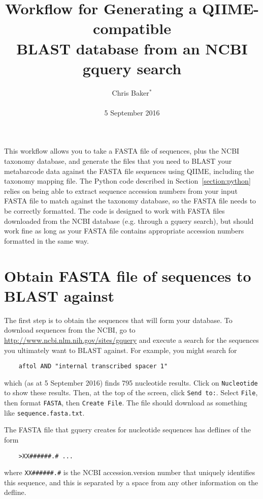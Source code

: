 \documentclass[11pt]{amsart}
\title{Workflow for Generating a QIIME-compatible\\BLAST database from an NCBI gquery search}
\author{Chris Baker$^*$\\ \\5 September 2016}
\begin{document}
\maketitle

\thispagestyle{fancy}

This workflow allows you to take a FASTA file of sequences, plus the NCBI taxonomy database, and generate the files that you need to BLAST your metabarcode data against the FASTA file sequences using QIIME, including the taxonomy mapping file. The Python code described in Section~\ref{section:python} relies on being able to extract sequence accession numbers from your input FASTA file to match against the taxonomy database, so the FASTA file needs to be correctly formatted. The code is designed to work with FASTA files downloaded from the NCBI database (e.g. through a gquery search), but should work fine as long as your FASTA file contains appropriate accession numbers formatted in the same way.

\section{Obtain FASTA file of sequences to BLAST against}
\label{section:gquery}

The first step is to obtain the sequences that will form your database. To download sequences from the NCBI, go to \url{http://www.ncbi.nlm.nih.gov/sites/gquery} and execute a search for the sequences you ultimately want to BLAST against. For example, you might search for

\begin{verbatim}
    aftol AND "internal transcribed spacer 1"
\end{verbatim}

which (as at 5 September 2016) finds 795 nucleotide results. Click on \verb|Nucleotide| to show these results. Then, at the top of the screen, click \verb|Send to:|. Select \verb|File|, then format \verb|FASTA|, then \verb|Create File|. The file should download as something like \verb|sequence.fasta.txt|.

The FASTA file that gquery creates for nucleotide sequences has deflines of the form

\begin{verbatim}
    >XX######.# ...
\end{verbatim}

where \verb|XX######.#| is the NCBI accession.version number that uniquely identifies this sequence, and this is separated by a space from any other information on the defline.
\end{document}
